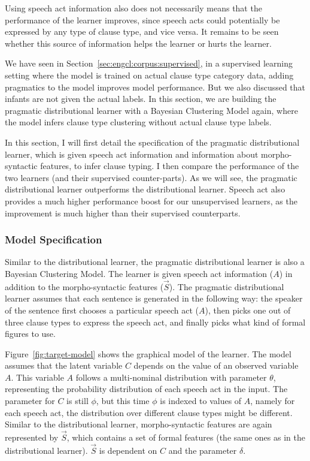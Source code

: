 Using speech act information also does not necessarily means that the performance of the learner improves, since speech acts could potentially be expressed by any type of clause type, and vice versa. It remains to be seen whether this source of information helps the learner or hurts the learner. 

We have seen in Section~\ref{sec:engcl:corpus:supervised}, in a supervised learning setting where the model is trained on actual clause type category data, adding pragmatics to the model improves model performance. But we also discussed that infants are not given the actual labels. In this section, we are building the pragmatic distributional learner with a Bayesian Clustering Model again, where the model infers clause type clustering without actual clause type labels. 

In this section, I will first detail the specification of the pragmatic distributional learner, which is given speech act information and information about morpho-syntactic features, to infer clause typing. I then compare the performance of the two learners (and their supervised counter-parts). As we will see, the pragmatic distributional learner outperforms the distributional learner. Speech act also provides a much higher performance boost for our unsupervised learners, as the improvement is much higher than their supervised counterparts.


\subsubsection{Model Specification}
\label{sec:engcl:model:prag:spec}


Similar to the distributional learner, the pragmatic distributional learner is also a Bayesian Clustering Model. The learner is given speech act information ($A$) in addition to the morpho-syntactic features ($\vec{S}$). The pragmatic distributional learner assumes that each sentence is generated in the following way: the speaker of the sentence first chooses a particular speech act ($A$), then picks one out of three clause types to express the speech act, and finally picks what kind of formal figures to use. 



Figure~\ref{fig:target-model} shows the graphical model of the learner. The model assumes that the latent variable $C$ depends on the value of an observed variable $A$. This variable $A$ follows a multi-nominal distribution with parameter $\theta$, representing the probability distribution of each speech act in the input. The parameter for $C$ is still $\phi$, but this time $\phi$ is indexed to values of $A$, namely for each speech act, the distribution over different clause types might be different. Similar to the distributional learner, morpho-syntactic features are again represented by $\vec{S}$, which contains a set of formal features (the same ones as in the distributional learner). $\vec{S}$ is dependent on $C$ and the parameter $\delta$. 

